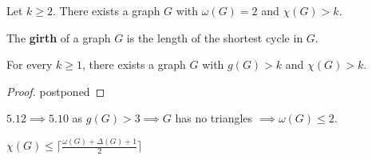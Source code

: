 \begin{theorem}\label{5.10}
    Let $k\geq 2$. There exists a graph $G$ with $\omega(G)=2$ and $\chi(G)>k$.
\end{theorem}
\begin{definition}\label{5.11}
    The \textbf{girth} of a graph $G$ is the length of the shortest cycle in $G$.
\end{definition}
\begin{theorem}\label{5.12}
    For every $k\geq 1$, there exists a graph $G$ with $g(G)>k$ and $\chi(G)>k$.
\end{theorem}
\begin{proof}
    postponed
\end{proof}
\begin{remark}\label{5.13}
    $5.12\implies 5.10$ as $g(G)>3\implies G$ has no triangles $\implies\omega(G)\leq2$.
\end{remark}
\begin{conjecture}[Reed]\label{5.14}
    $\chi(G)\leq\lceil\frac{\omega(G)+\Delta(G)+1}{2}\rceil$
\end{conjecture}



